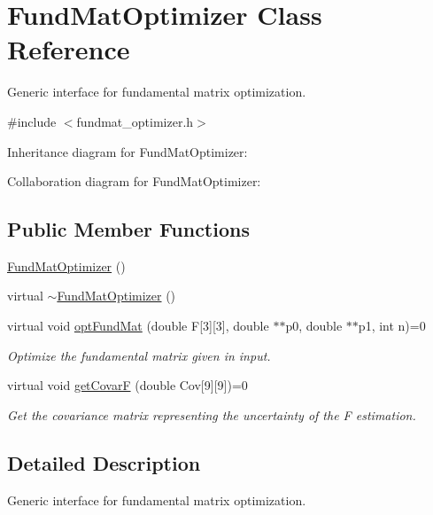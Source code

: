 \hypertarget{classFundMatOptimizer}{}\section{Fund\+Mat\+Optimizer Class Reference}
\label{classFundMatOptimizer}


Generic interface for fundamental matrix optimization.  




{\ttfamily \#include $<$fundmat\+\_\+optimizer.\+h$>$}



Inheritance diagram for Fund\+Mat\+Optimizer\+:


Collaboration diagram for Fund\+Mat\+Optimizer\+:
\subsection*{Public Member Functions}
\begin{DoxyCompactItemize}
\item 
\hyperlink{classFundMatOptimizer_ab8b1130d8f0e3db31a453cb9f176885b}{Fund\+Mat\+Optimizer} ()
\item 
virtual \hyperlink{classFundMatOptimizer_aa9f02c90f2f4a56cf9f6bf6397907b8a}{$\sim$\+Fund\+Mat\+Optimizer} ()
\item 
virtual void \hyperlink{classFundMatOptimizer_a608a81ada669a6105b274d193039b081}{opt\+Fund\+Mat} (double F\mbox{[}3\mbox{]}\mbox{[}3\mbox{]}, double $\ast$$\ast$p0, double $\ast$$\ast$p1, int n)=0
\begin{DoxyCompactList}\small\item\em Optimize the fundamental matrix given in input. \end{DoxyCompactList}\item 
virtual void \hyperlink{classFundMatOptimizer_a6a61af2de52b5dc0a8fc20420a5d8b2e}{get\+Covar\+F} (double Cov\mbox{[}9\mbox{]}\mbox{[}9\mbox{]})=0
\begin{DoxyCompactList}\small\item\em Get the covariance matrix representing the uncertainty of the F estimation. \end{DoxyCompactList}\end{DoxyCompactItemize}


\subsection{Detailed Description}
Generic interface for fundamental matrix optimization. 

